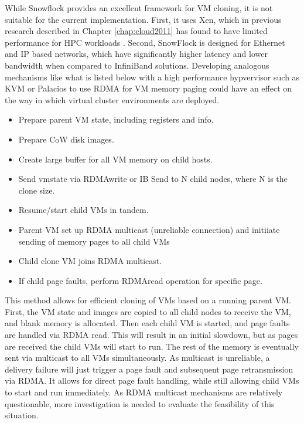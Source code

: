 While Snowflock provides an excellent framework for VM cloning, it is not suitable for the current implementation. First, it uses Xen, which in previous research described in Chapter \ref{chap:cloud2011} has found to have limited performance for HPC workloads \cite{Younge2011cloud}.  Second, SnowFlock is designed for Ethernet and IP based networks, which have significantly higher latency and lower bandwidth when compared to InfiniBand solutions.  Developing analogous mechanisms like what is listed below with a high performance hypvervisor such as KVM or Palacios \cite{lange2010palacios} to use RDMA for VM memory paging could have an effect on the way in which virtual cluster environments are deployed. %

\begin{itemize}
\item Prepare parent VM state, including registers and info.
\item Prepare CoW disk images.
\item Create large buffer for all VM memory on child hosts. 
\item Send vmstate via RDMAwrite or IB Send to N child nodes, where N is the clone size.
\item Resume/start child VMs in tandem. 
\item Parent VM set up RDMA multicast (unreliable connection) and initiiate sending of memory pages to all child VMs 
\item Child clone VM joins RDMA multicast.
\item If child page faults, perform RDMAread operation for specific page. 
\end{itemize}

This method allows for efficient cloning of VMs based on a running parent VM. First, the VM state and images are copied to all child nodes to receive the VM, and blank memory is allocated. Then each child VM is started, and page faults are handled via RDMA read. This will result in an initial slowdown, but as pages are received the child VMs will start to run. The rest of the memory is eventually sent via multicast to all VMs simultaneously.   As multicast is unreliable, a delivery failure will just trigger a page fault and subsequent page retransmission via RDMA.  It allows for direct page fault handling, while still allowing child VMs to start and run immediately. As RDMA multicast mechanisms are relatively questionable,  more investigation is needed to evaluate the feasibility of this situation. %

